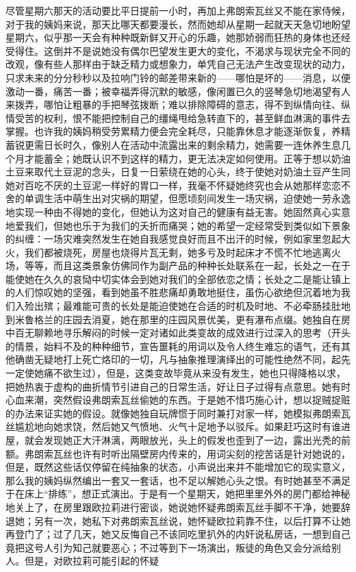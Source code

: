 \par 尽管星期六那天的活动要比平日提前一小时，再加上弗朗索瓦丝又不能在家侍候，对于我的姨妈来说，那天比哪天都要漫长，然而她却从星期一起就天天急切地盼望星期六，似乎那一天会有种种既新鲜又开心的乐趣，她那娇弱而狂热的身体也还经受得住。这倒并不是说她没有偶尔巴望发生更大的变化，不渴求与现状完全不同的改观，像有些人那样由于缺乏精力或想象力，单凭自己无法产生改变现状的动力，只求未来的分分秒秒以及拉响门铃的邮差带来新的——哪怕是坏的——消息，以便激动一番，痛苦一番；被幸福弄得沉默的敏感，像闲置已久的竖琴急切地渴望有人来拨弄，哪怕让粗暴的手把琴弦拨断；难以排除障碍的意志，得不到纵情向往、纵情受苦的权利，恨不能把控制自己的缰绳甩给急转直下的，甚至鲜血淋漓的事件去掌握。也许我的姨妈稍受劳累精力便会完全耗尽，只能靠休息才能逐渐恢复，养精蓄锐更需日长时久，像别人在活动中流露出来的剩余精力，她需要一连休养生息几个月才能蓄全；她既认识不到这样的精力，更无法决定如何使用。正等于想以奶油土豆来取代土豆泥的念头，日复一日萦绕在她的心头，终于使她对奶油土豆产生同她对百吃不厌的土豆泥一样好的胃口一样，我毫不怀疑她终究也会从她那样恋恋不舍的单调生活中萌生出对灾祸的期望，但愿顷刻间发生一场灾祸，迫使她一劳永逸地实现一种由不得她的变化，但她认为这对自己的健康有益无害。她固然真心实意地爱我们，但她也乐于为我们的夭折而痛哭；她的希望一定经常受到类似如下景象的纠缠：一场灾难突然发生在她自我感觉良好而且不出汗的时候，例如家里忽起大火，我们都被烧死，房屋也烧得片瓦无剩，她多亏及时起床才不慌不忙地逃离火场，等等，而且这类景象仿佛同作为副产品的种种长处联系在一起，长处之一在于能使她在久久的哀恸中切实体会到她对我们的全部依恋之情；长处之二是能让镇上的人们惊叹她的坚强，看到她虽不胜悲痛却勇敢地挺住，虽伤心欲绝但沉着地为我们入殓出殡；最难能可贵的长处是能迫使她在合适的时机及时地、不必牵肠挂肚地到米鲁格兰的庄园去消夏，她在那里的庄园风景优美，更有瀑布点缀。她独自在房中百无聊赖地寻乐解闷的时候一定对诸如此类变故的成效进行过深入的思考（开头的情景，始料不及的种种细节，宣告噩耗的用词以及令人终生难忘的语气，还有其他确凿无疑地打上死亡烙印的一切，凡与抽象推理演绎出的可能性绝然不同，起先一定使她痛不欲生过），但是，这类变故毕竟从来没有发生，她也只得降格以求，把她热衷于虚构的曲折情节引进自己的日常生活，好让日子过得有点意思。她有时心血来潮，突然假设弗朗索瓦丝偷她的东西。于是她不惜巧施心计，想以捉贼捉赃的办法来证实她的假设。就像她独自玩牌惯于同时兼打对家一样，她模拟弗朗索瓦丝尴尬地向她求饶，然后她又气愤地、火气十足地予以驳斥。如果赶巧这时有谁进屋，就会发现她正大汗淋漓，两眼放光，头上的假发也歪到了一边，露出光秃的前额。弗朗索瓦丝也许有时听出隔壁房内传来的，用词尖刻的挖苦话是针对她说的，但是，既然这些话仅停留在纯抽象的状态，小声说出来并不能增加它的现实意义，那么我的姨妈纵然编出一套又一套话，也不足以解她心头之恨。有时她甚至不满足于在床上“排练”，想正式演出。于是有一个星期天，她把里里外外的房门都给神秘地关上了，在房里跟欧拉莉进行密谈，她说她怀疑弗朗索瓦丝手脚不干净，她要辞退她；另有一次，她私下对弗朗索瓦丝说，她怀疑欧拉莉靠不住，以后打算不让她再登门了；过了几天，她又反悔自己不该同吃里扒外的内奸说私房话，一想到自己竟把这号人引为知己就要恶心；不过等到下一场演出，叛徒的角色又会分派给别人。但是，对欧拉莉可能引起的怀疑